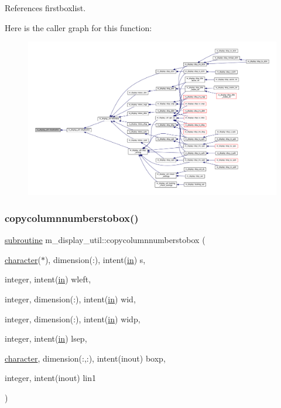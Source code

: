 References firstboxlist.

Here is the caller graph for this function\+:
\nopagebreak
\begin{figure}[H]
\begin{center}
\leavevmode
\includegraphics[width=350pt]{namespacem__display__util_acc9b3b8faeba5d61ec46d3d76c161d27_icgraph}
\end{center}
\end{figure}
\mbox{\label{namespacem__display__util_a43abab0fd2426042dc21b42e638210a8}} 
\subsubsection{\texorpdfstring{copycolumnnumberstobox()}{copycolumnnumberstobox()}}
{\footnotesize\ttfamily \hyperlink{M__stopwatch_83_8txt_acfbcff50169d691ff02d4a123ed70482}{subroutine} m\+\_\+display\+\_\+util\+::copycolumnnumberstobox (\begin{DoxyParamCaption}\item[{\hyperlink{option__stopwatch_83_8txt_abd4b21fbbd175834027b5224bfe97e66}{character}($\ast$), dimension(\+:), intent(\hyperlink{M__journal_83_8txt_afce72651d1eed785a2132bee863b2f38}{in})}]{s,  }\item[{integer, intent(\hyperlink{M__journal_83_8txt_afce72651d1eed785a2132bee863b2f38}{in})}]{wleft,  }\item[{integer, dimension(\+:), intent(\hyperlink{M__journal_83_8txt_afce72651d1eed785a2132bee863b2f38}{in})}]{wid,  }\item[{integer, dimension(\+:), intent(\hyperlink{M__journal_83_8txt_afce72651d1eed785a2132bee863b2f38}{in})}]{widp,  }\item[{integer, intent(\hyperlink{M__journal_83_8txt_afce72651d1eed785a2132bee863b2f38}{in})}]{lsep,  }\item[{\hyperlink{option__stopwatch_83_8txt_abd4b21fbbd175834027b5224bfe97e66}{character}, dimension(\+:,\+:), intent(inout)}]{boxp,  }\item[{integer, intent(inout)}]{lin1 }\end{DoxyParamCaption})\hspace{0.3cm}{\ttfamily [private]}}

